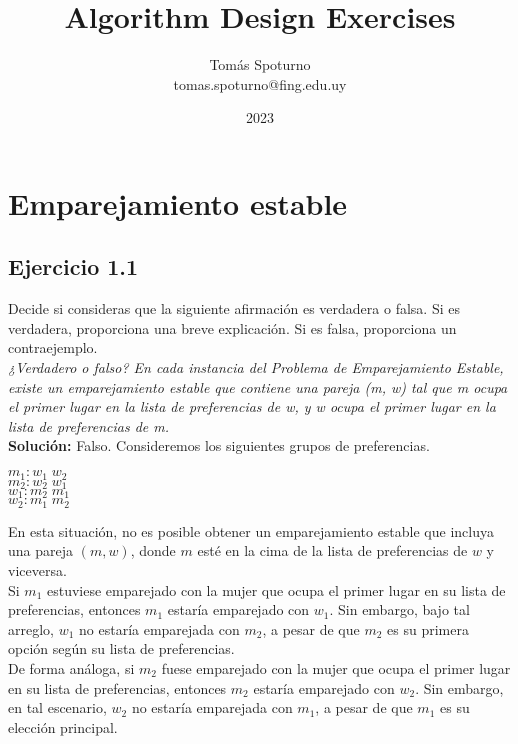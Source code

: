 \documentclass{article}
\title{Algorithm Design Exercises}
\author{ Tomás Spoturno \\ tomas.spoturno@fing.edu.uy }
\date{2023}
\begin{document}
\maketitle \newpage

\tableofcontents \newpage


\section{Emparejamiento estable}

\subsection{Ejercicio 1.1}
Decide si consideras que la siguiente afirmación es verdadera o falsa. Si es verdadera, proporciona una breve explicación. Si es falsa, proporciona un contraejemplo. \\

\emph{¿Verdadero o falso? En cada instancia del Problema de Emparejamiento Estable, existe un emparejamiento estable que contiene una pareja (m, w) tal que m ocupa el primer lugar en la lista de preferencias de w, y w ocupa el primer lugar en la lista de preferencias de m.} \\ 

\textbf{Solución:} Falso. Consideremos los siguientes grupos de preferencias.
\begin{center}
$m_1: w_1 \; w_2$\\
$m_2: w_2 \; w_1$\\
$w_1: m_2 \; m_1 $\\
$w_2: m_1 \; m_2$
\end{center}

En esta situación, no es posible obtener un emparejamiento estable que incluya una pareja $(m, w)$, donde $m$ esté en la cima de la lista de preferencias de $w$ y viceversa. \\

Si $m_1$ estuviese emparejado con la mujer que ocupa el primer lugar en su lista de preferencias, entonces $m_1$ estaría emparejado con $w_1$. Sin embargo, bajo tal arreglo, $w_1$ no estaría emparejada con $m_2$, a pesar de que $m_2$ es su primera opción según su lista de preferencias.\\

De forma análoga, si $m_2$ fuese emparejado con la mujer que ocupa el primer lugar en su lista de preferencias, entonces $m_2$ estaría emparejado con $w_2$. Sin embargo, en tal escenario, $w_2$ no estaría emparejada con $m_1$, a pesar de que $m_1$ es su elección principal.\\
\end{document}
